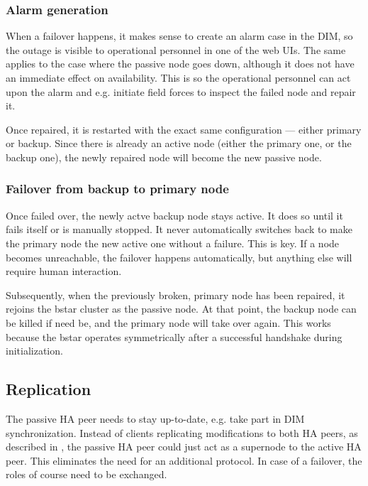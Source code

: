 \subsubsection{Alarm generation}
When a failover happens, it makes sense to create an alarm case in the
DIM, so the outage is visible to operational personnel in one of the web UIs.
The same applies to the case where the passive node goes down, although it
does not have an immediate effect on availability.  This is so the operational
personnel can act upon the alarm and e.g. initiate field forces to inspect the
failed node and repair it.

Once repaired, it is restarted with the exact same configuration --- either primary
or backup. Since there is already an active node (either the primary one,
or the backup one), the newly repaired node will become the new passive node.

\subsubsection{Failover from backup to primary node}
Once failed over, the newly actve backup node stays active. It does so until it
fails itself or is manually stopped. It never automatically switches back to
make the primary node the new active one without a failure. This is key. If a
node becomes unreachable, the failover happens automatically, but anything else will
require human interaction.

Subsequently, when the previously broken, primary node has been repaired, it
rejoins the \gls{bstar} cluster as the passive node. At that point, the backup
node can be killed if need be, and the primary node will take over again.  This
works because the \gls{bstar} operates symmetrically after a successful
handshake during initialization.

\subsection{Replication}
The passive HA peer needs to stay up-to-date, e.g. take part in DIM
synchronization. Instead of clients replicating modifications to both HA peers, as
described in \cite[Chapter 5 - Advanced Pub-Sub Patterns, The Clustered Hashmap
Protocol]{zmq:zguide}, the passive HA peer could just act as a supernode to the
active HA peer. This eliminates the need for an additional protocol. In case of
a failover, the roles of course need to be exchanged.

